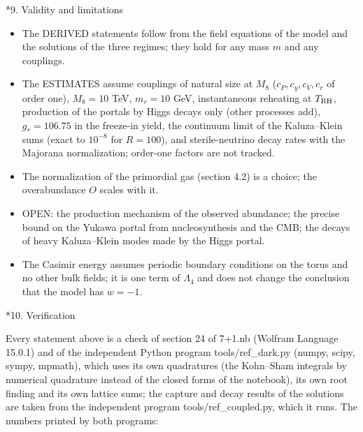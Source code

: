 \documentclass[10pt,a4paper]{article}
\makeatletter
\renewcommand\section{\@startsection{section}{1}{\z@}{-3.5ex \@plus -1ex \@minus -.2ex}{2.3ex \@plus.2ex}{\normalfont\Large\bfseries\raggedright}}
\makeatother
\begin{document}
\section*{9. Validity and limitations}
\begin{itemize}
\item The DERIVED statements follow from the field equations of the model and the solutions of the three regimes; they hold for any mass $m$ and any couplings.
\item The ESTIMATES assume couplings of natural size at $M_8$ ($c_P,c_y,c_V,c_r$ of order one), $M_8=10$ TeV, $m_r=10$ GeV, instantaneous reheating at $T_{\rm RH}$, production of the portals by Higgs decays only (other processes add), $g_*=106.75$ in the freeze-in yield, the continuum limit of the Kaluza–Klein sums (exact to $10^{-8}$ for $R=100$), and sterile-neutrino decay rates with the Majorana normalization; order-one factors are not tracked.
\item The normalization of the primordial gas (section 4.2) is a choice; the overabundance $O$ scales with it.
\item OPEN: the production mechanism of the observed abundance; the precise bound on the Yukawa portal from nucleosynthesis and the CMB; the decays of heavy Kaluza–Klein modes made by the Higgs portal.
\item The Casimir energy assumes periodic boundary conditions on the torus and no other bulk fields; it is one term of $\Lambda_4$ and does not change the conclusion that the model has $w=-1$.
\end{itemize}
\section*{10. Verification}
Every statement above is a check of section 24 of 7+1.nb (Wolfram Language 15.0.1) and of the independent Python program tools/ref\_dark.py (numpy, scipy, sympy, mpmath), which uses its own quadratures (the Kohn–Sham integrals by numerical quadrature instead of the closed forms of the notebook), its own root finding and its own lattice sums; the capture and decay results of the solutions are taken from the independent program tools/ref\_coupled.py, which it runs. The numbers printed by both programs:
\end{document}
